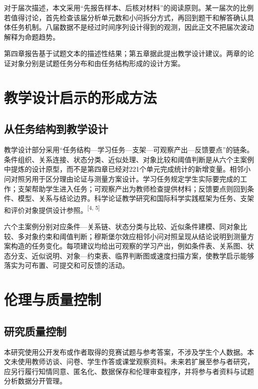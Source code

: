 \documentclass[
  12pt,
  a4paper,twoside,openany]{ctexbook}
\begin{document}
对于届次描述，本文采用``先报告样本、后核对材料''的阅读原则。某一届次的比例若值得讨论，首先检查该届分析单元数和小问拆分方式，再回到题干和解答确认具体任务机制。八届数据不是经过时间序列设计得到的观测，因此正文不把届次波动解释为命题趋势。

第四章报告基于试题文本的描述性结果；第五章据此提出教学设计建议。两章的论证对象分别是试题任务分布和由任务结构形成的设计方案。

\section{教学设计启示的形成方法}\label{ux6559ux5b66ux8bbeux8ba1ux542fux793aux7684ux5f62ux6210ux65b9ux6cd5}

\subsection{从任务结构到教学设计}\label{ux4eceux4efbux52a1ux7ed3ux6784ux5230ux6559ux5b66ux8bbeux8ba1}

教学设计部分采用``任务结构---学习任务---支架---可观察产出---反馈要点''的链条。条件组织、关系连接、状态分类、近似处理、对象比较和阈值判断是从六个主案例中提炼的设计原型，而不是第四章已经对221个单元完成统计的新增变量。相邻小问对照另用于区分理由论证与测量方案设计。学习任务规定学生实际要完成的工作；支架帮助学生进入任务；可观察产出为教师检查提供材料；反馈要点则回到条件、模型、关系与结论边界。科学论证教学研究和国际科学实践框架为任务、支架和评价对象提供设计参照。\textsuperscript{[4, 5]}

六个主案例分别对应条件---关系链、状态分类与比较、近似条件建模、同对象比较、多对象约束和阈值判断；穆斯堡尔效应相邻小问对照呈现从结论说明到测量方案构造的任务变化。每项建议均给出可观察的学习产出，例如条件表、关系图、状态分支、近似说明、对象---约束表、临界判断图或速度扫描方案，使教学启示能够落实为可布置、可提交和可反馈的活动。

\section{伦理与质量控制}\label{ux4f26ux7406ux4e0eux8d28ux91cfux63a7ux5236}

\subsection{研究质量控制}\label{ux7814ux7a76ux8d28ux91cfux63a7ux5236}

本研究使用公开发布或作者取得的竞赛试题与参考答案，不涉及学生个人数据。本文未使用教师访谈、问卷、学生作答或课堂观察资料。未来若扩展至参与者研究，应另行履行知情同意、匿名化、数据保存和伦理审查程序，并将参与者资料与试题分析数据分开管理。
\end{document}
